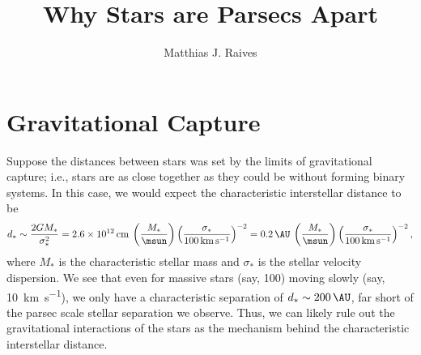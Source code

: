 \documentclass{article}
\title{Why Stars are Parsecs Apart}
\author{Matthias J. Raives}
\begin{document}
  
  \maketitle{}
  
  \section{Gravitational Capture}
  Suppose the distances between stars was set by the limits of gravitational capture; i.e., stars are as close together as they could be without forming binary systems.  In this case, we would expect the characteristic interstellar distance to be
  \begin{equation}
    d_{\ast} \sim \frac{2GM_{\ast}}{\sigma_{\ast}^{2}} = \SI{2.6e12}{\cm}\:\left(\frac{M_{\ast}}{\si{\msun}}\right)\left(\frac{\sigma_{\ast}}{\SI{100}{\km\per\second}}\right)^{-2} = \SI{0.2}{\AU}\:\left(\frac{M_{\ast}}{\si{\msun}}\right)\left(\frac{\sigma_{\ast}}{\SI{100}{\km\per\second}}\right)^{-2},
  \end{equation}
  where $M_{\ast}$ is the characteristic stellar mass and $\sigma_{\ast}$ is the stellar velocity dispersion.  We see that even for massive stars (say, \SI{100}{\msun}) moving slowly (say, \SI{10}{\km\per\second}), we only have a characteristic separation of $d_{\ast}\sim\SI{200}{\AU}$, far short of the parsec scale stellar separation we observe.  Thus, we can likely rule out the gravitational interactions of the stars as the mechanism behind the characteristic interstellar distance.
  
\end{document}
